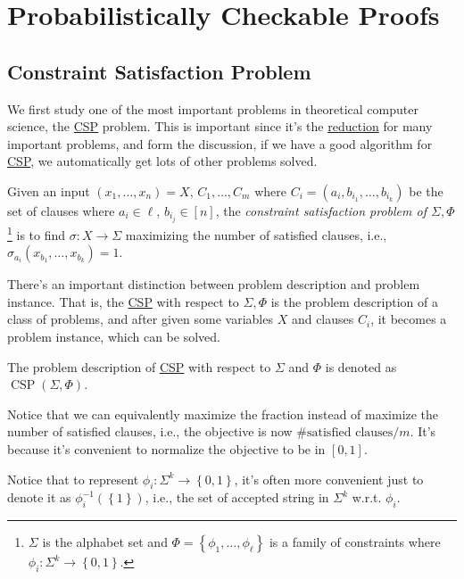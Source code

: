\section{Probabilistically Checkable Proofs}
\subsection{Constraint Satisfaction Problem}
We first study one of the most important problems in theoretical computer science, the \hyperref[prb:CSP]{CSP} problem. This is important since it's the \hyperref[def:reduction]{reduction} for many important problems, and form the discussion, if we have a good algorithm for \hyperref[prb:CSP]{CSP}, we automatically get lots of other problems solved.

\begin{problem}[CSP]\label{prb:CSP}
Given an input \((x_1, \ldots , x_n) = X\), \(C_1, \ldots  , C_m\) where \(C_i = (a_i, b_{i_1}, \ldots , b_{i_k})\) be the set of clauses where \(a_i\in {\ell }\), \(b_{i_j}\in [n]\), the \emph{constraint satisfaction problem of \(\Sigma, \Phi \)}\footnote{\(\Sigma \) is the alphabet set and \(\Phi = \left\{ \phi _1, \ldots , \phi _{\ell }  \right\} \) is a family of constraints where \(\phi _i \colon \Sigma ^k \to \left\{ 0, 1 \right\} \).} is to find \(\sigma \colon X\to \Sigma \) maximizing the number of satisfied clauses, i.e., \(\sigma _{a_i}(x_{b_1},\ldots , x_{b_k} )=1\).
\end{problem}

There's an important distinction between problem description and problem instance. That is, the \hyperref[prb:CSP]{CSP} with respect to \(\Sigma, \Phi \) is the problem description of a class of problems, and after given some variables \(X\) and clauses \(C_i\), it becomes a problem instance, which can be solved.

\begin{notation}
	The problem description of \hyperref[prb:CSP]{CSP} with respect to \(\Sigma \) and \(\Phi \) is denoted as \(\mathop{\mathrm{CSP}}(\Sigma , \Phi )\).
\end{notation}

Notice that we can equivalently maximize the fraction instead of maximize the number of satisfied clauses, i.e., the objective is now \(\#\text{satisfied clauses} / m \). It's because it's convenient to normalize the objective to be in \([0, 1]\).

\begin{note}
	Notice that to represent \(\phi _i \colon \Sigma ^k \to \left\{ 0, 1 \right\} \), it's often more convenient just to denote it as \(\phi _i ^{-1} (\left\{ 1 \right\} )\), i.e., the set of accepted string in \(\Sigma ^k\) w.r.t. \(\phi _i\).
\end{note}

